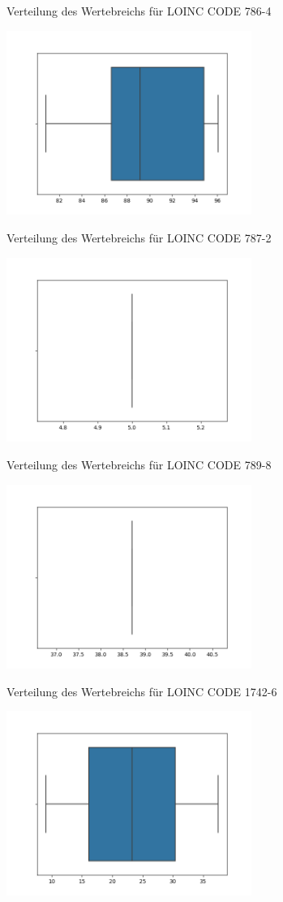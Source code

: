 \documentclass[12pt,a4paper,toc=bibliographynumbered,toc=indenttextentries]{scrreprt}
\begin{document}
\begin{center}
			\small{Verteilung des Wertebreichs für LOINC CODE 786-4}
			
			\includegraphics[width=8cm]{Graphs/787-2.png}
			
			\small{Verteilung des Wertebreichs für LOINC CODE 787-2}
			
			\includegraphics[width=8cm]{Graphs/789-8.png}
			
			\small{Verteilung des Wertebreichs für LOINC CODE 789-8}
			
			\includegraphics[width=8cm]{Graphs/1742-6.png}
			
			\small{Verteilung des Wertebreichs für LOINC CODE 1742-6}
			
			\includegraphics[width=8cm]{Graphs/1920-8.png}
			

\end{center}
\end{document}
